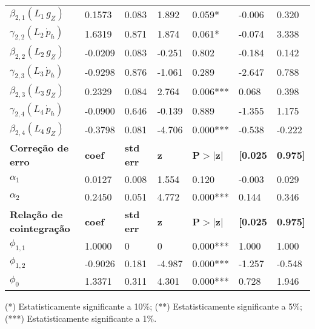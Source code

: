 \begin{threeparttable}
\begin{tabular}{l|llllll}
		$\beta_{2,1} (L_1\, g_Z)$       &       0.1573  &        0.083     &     1.892  &         0.059*        &       -0.006    &        0.320     \\
		$\gamma_{2,2} (L_2\, \dot p_h)$ &       1.6319  &        0.871     &     1.874  &         0.061*        &       -0.074    &        3.338     \\
		$\beta_{2,2} (L_2\, g_Z)$       &      -0.0209  &        0.083     &    -0.251  &         0.802        &       -0.184    &        0.142     \\
		$\gamma_{2,3} (L_3\, \dot p_h)$ &      -0.9298  &        0.876     &    -1.061  &         0.289        &       -2.647    &        0.788     \\
		$\beta_{2,3} (L_3\, g_Z)$       &       0.2329  &        0.084     &     2.764  &         0.006***        &        0.068    &        0.398     \\
		$\gamma_{2,4} (L_4\, \dot p_h)$ &      -0.0900  &        0.646     &    -0.139  &         0.889        &       -1.355    &        1.175     \\
		$\beta_{2,4} (L_4\,g_Z)$       &      -0.3798  &        0.081     &    -4.706  &         0.000***        &       -0.538    &       -0.222     \\\hline
		\textbf{Correção de erro}& \textbf{coef} & \textbf{std err} & \textbf{z} & \textbf{P$> |$z$|$} & \textbf{[0.025} & \textbf{0.975]}  \\
		\hline
		\textbf{$\alpha_1$} &       0.0127  &        0.008     &     1.554  &         0.120        &       -0.003    &        0.029     \\
		\textbf{$\alpha_2$} &       0.2450  &        0.051     &     4.772  &         0.000***        &        0.144    &        0.346     \\\hline
		\textbf{Relação de cointegração}& \textbf{coef} & \textbf{std err} & \textbf{z} & \textbf{P$> |$z$|$} & \textbf{[0.025} & \textbf{0.975]}  \\
		\hline
		\textbf{$\phi_{1,1}$} &       1.0000  &            0     &         0  &         0.000***        &        1.000    &        1.000     \\
		\textbf{$\phi_{1,2}$} &      -0.9026  &        0.181     &    -4.987  &         0.000***        &       -1.257    &       -0.548     \\
		\textbf{$\phi_0$}  &       1.3371  &        0.311     &     4.301  &         0.000***        &        0.728    &        1.946     \\
		\hline\hline
	\end{tabular}
\footnotesize{(*) Estatisticamente significante a 10\%; (**) Estatisticamente significante a 5\%; (***) Estatisticamente significante a 1\%.}
\end{threeparttable}